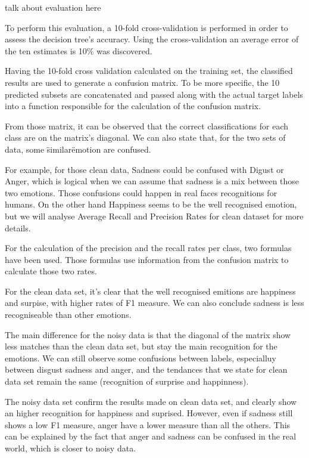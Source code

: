 

talk about evaluation here


To perform this evaluation, a 10-fold cross-validation is performed in order to assess the decision tree’s accuracy.
Using the cross-validation an average error of the ten estimates is 10\% was discovered.

Having the 10-fold cross validation calculated on the training set, the classified results
are used to generate a confusion matrix.
To be more specific, the 10 predicted subsets are concatenated
and passed along with the actual target labels into a function responsible for the calculation of the confusion matrix.

From those matrix, it can be observed that the correct classifications for each class are on the matrix’s diagonal.
We can also state that, for the two sets of data, some \"similar\" emotion are confused.



For example, for those clean data, Sadness could be confused with Digust or Anger, which is logical when we can assume that sadness is a mix between those two emotions. 
Those confusions could happen in real faces recognitions for humans.
On the other hand Happiness seems to be the well recognised emotion, but we will
analyse Average Recall and Precision Rates for clean dataset for more details. 




For the calculation of the precision and the recall rates per class, two formulas have been used.
Those formulas use information from the confusion matrix to calculate those two rates.

For the clean data set, it's clear that the well recognised emitions are happiness and surpise, with higher rates of F1 measure. 
We can also conclude sadness is less recogniseable than other emotions.



The main difference for the noisy data is that the diagonal of the matrix show less matches than the clean data set, but stay the main recognition for the emotions.
We can still observe some confusions between labels, especialluy between disgust sadness and anger, and the tendances that we state for clean data set remain the same (recognition of surprise and happinness).




The noisy data set confirm the results made on clean data set, and clearly show an higher recognition for happiness and suprised. However, even if sadness still shows a low F1 measure, anger have a lower measure than all the others. This can be explained by the fact that anger and sadness can be confused in the real world, which is closer to noisy data. 
